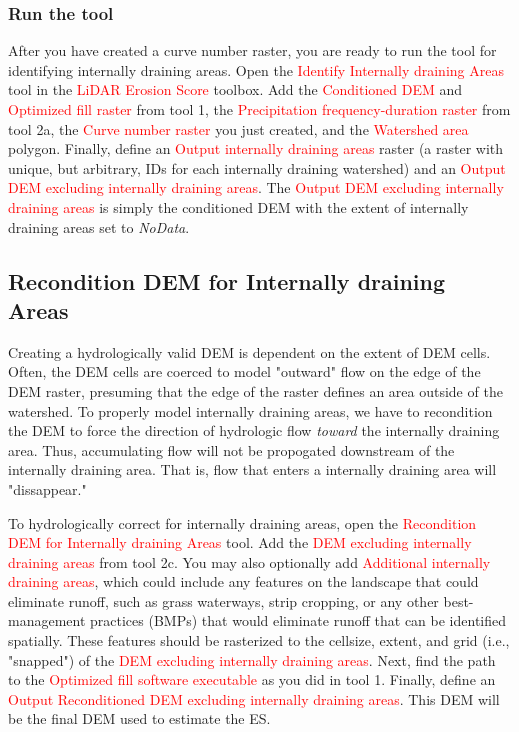 \documentclass{article}
\newcommand{\toolPar}[1]{\textcolor{red}{#1}}
\begin{document}
		\subsubsection{Run the tool}
			After you have created a curve number raster, you are ready to run the tool for identifying internally draining areas. Open the \toolPar{Identify Internally draining Areas} tool in the \toolPar{LiDAR Erosion Score} toolbox. Add the \toolPar{Conditioned DEM} and \toolPar{Optimized fill raster} from tool 1, the \toolPar{Precipitation frequency-duration raster} from tool 2a, the \toolPar{Curve number raster} you just created, and the \toolPar{Watershed area} polygon. Finally, define an \toolPar{Output internally draining areas} raster (a raster with unique, but arbitrary, IDs for each internally draining watershed) and an \toolPar{Output DEM excluding internally draining areas}. The \toolPar{Output DEM excluding internally draining areas} is simply the conditioned DEM with the extent of internally draining areas set to \emph{NoData}.
	\subsection{Recondition DEM for Internally draining Areas}
		Creating a hydrologically valid DEM is dependent on the extent of DEM cells. Often, the DEM cells are coerced to model "outward" flow on the edge of the DEM raster, presuming that the edge of the raster defines an area outside of the watershed. To properly model internally draining areas, we have to recondition the DEM to force the direction of hydrologic flow \emph{toward} the internally draining area. Thus, accumulating flow will not be propogated downstream of the internally draining area. That is, flow that enters a internally draining area will "dissappear."
		
		To hydrologically correct for internally draining areas, open the \toolPar{Recondition DEM for Internally draining Areas} tool. Add the \toolPar{DEM excluding internally draining areas} from tool 2c. You may also optionally add \toolPar{Additional internally draining areas}, which could include any features on the landscape that could eliminate runoff, such as grass waterways, strip cropping, or any other best-management practices (BMPs) that would eliminate runoff that can be identified spatially. These features should be rasterized to the cellsize, extent, and grid (i.e., "snapped") of the \toolPar{DEM excluding internally draining areas}. Next, find the path to the \toolPar{Optimized fill software executable} as you did in tool 1. Finally, define an \toolPar{Output Reconditioned DEM excluding internally draining areas}. This DEM will be the final DEM used to estimate the ES.
\end{document}
